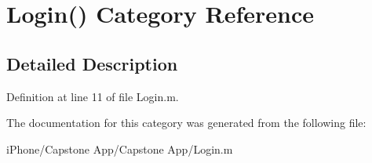 \hypertarget{category_login_07_08}{\section{Login() Category Reference}
\label{category_login_07_08}
}


\subsection{Detailed Description}


Definition at line 11 of file Login.\-m.



The documentation for this category was generated from the following file\-:\begin{DoxyCompactItemize}
\item 
i\-Phone/\-Capstone App/\-Capstone App/Login.\-m\end{DoxyCompactItemize}
